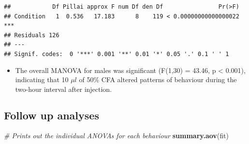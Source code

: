 \documentclass[
]{book}
\newenvironment{Shaded}{\begin{snugshade}}{\end{snugshade}}
\newcommand{\CommentTok}[1]{\textcolor[rgb]{0.56,0.35,0.01}{\textit{#1}}}
\newcommand{\FunctionTok}[1]{\textcolor[rgb]{0.13,0.29,0.53}{\textbf{#1}}}
\newcommand{\NormalTok}[1]{#1}
\providecommand{\tightlist}{%
  \setlength{\itemsep}{0pt}\setlength{\parskip}{0pt}}
\begin{document}
\begin{verbatim}
##            Df Pillai approx F num Df den Df                Pr(>F)    
## Condition   1  0.536   17.183      8    119 < 0.00000000000000022 ***
## Residuals 126                                                        
## ---
## Signif. codes:  0 '***' 0.001 '**' 0.01 '*' 0.05 '.' 0.1 ' ' 1
\end{verbatim}

\begin{itemize}
\tightlist
\item
  The overall MANOVA for males was significant (F(1,30) = 43.46, p \textless{} 0.001), indicating that 10 \(\mu l\) of 50\% CFA altered patterns of behaviour during the two-hour interval after injection.
\end{itemize}

\hypertarget{follow-up-analyses}{%
\subsection*{Follow up analyses}\label{follow-up-analyses}}

\begin{Shaded}
\begin{Highlighting}[]
\CommentTok{\# Prints out the individual ANOVAs for each behaviour}
\FunctionTok{summary.aov}\NormalTok{(fit)}
\end{Highlighting}
\end{Shaded}
\end{document}
